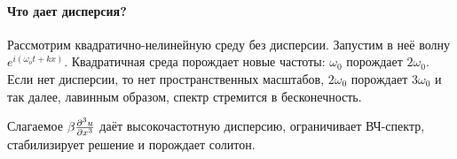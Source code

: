 \paragraph{Что дает дисперсия? } Рассмотрим квадратично-нелинейную среду без дисперсии.
Запустим в неё волну $e^{i(\omega_o t+kx)}$. Квадратичная среда порождает новые частоты: $\omega_0$ порождает $2\omega_0$. Если нет дисперсии, то нет пространственных масштабов, $2\omega_0$ порождает $3\omega_0$ и так далее, лавинным образом, спектр стремится в бесконечность. 

Слагаемое $\beta\pdv[3]{u}{x}$ даёт высокочастотную дисперсию, ограничивает ВЧ-спектр, стабилизирует решение и порождает солитон.

